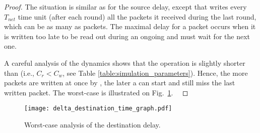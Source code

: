 \begin{proof}
The situation is similar as for the source delay, except
that \cpdst writes every $T_{net}$ time unit (\ie after each round) all the packets it received during the last round, which can be as many as \nslotsmax packets.
The maximal delay for a packet occurs when it is written too late to be read out during an ongoing \opflush and must wait for the next one.

A careful analysis of the \bolt dynamics shows that the \opread operation is slightly shorter than \opwrite \cite{sutton2015Bolt} (i.e., $C_r < C_w$, see Table \ref{table:simulation_parameters}). Hence, the more packets are written at once by \cpdst, the later a \opflush can start and still miss the last written packet. The worst-case is illustrated on Fig.~\ref{fig:delta_destination_time_graph}. \
\end{proof}

\begin{figure}[h!]
\centering
\texttt{[image: delta\_destination\_time\_graph.pdf]}
\caption{Worst-case analysis of the destination delay.
}
\label{fig:delta_destination_time_graph}
\end{figure}
